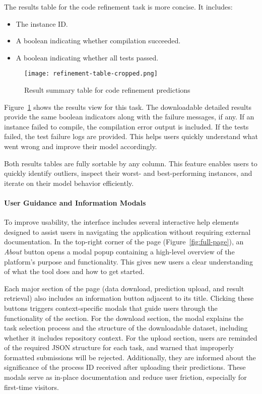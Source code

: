 The results table for the code refinement task is more concise. It includes:
\begin{itemize}
	\item The instance ID.
	\item A boolean indicating whether compilation succeeded.
	\item A boolean indicating whether all tests passed.
\end{itemize}

\begin{figure}[H]
	\centering
	\texttt{[image: refinement-table-cropped.png]}
	\caption{Result summary table for code refinement predictions}
	\label{fig:refinement-table}
\end{figure}

Figure~\ref{fig:refinement-table} shows the results view for this task. The downloadable detailed
results provide the same boolean indicators along with the failure messages, if any. If an instance
failed to compile, the compilation error output is included. If the tests failed, the test failure
logs are provided. This helps users quickly understand what went wrong and improve their model
accordingly.

Both results tables are fully sortable by any column. This feature enables users to quickly identify
outliers, inspect their worst- and best-performing instances, and iterate on their model behavior
efficiently.

\paragraph{User Guidance and Information Modals}

To improve usability, the interface includes several interactive help elements designed to assist
users in navigating the application without requiring external documentation. In the top-right
corner of the page (Figure~\ref{fig:full-page}), an \textit{About} button opens a modal popup
containing a high-level overview of the platform's purpose and functionality. This gives new users a
clear understanding of what the tool does and how to get started.

Each major section of the page (data download, prediction upload, and result retrieval) also
includes an information button adjacent to its title. Clicking these buttons triggers
context-specific modals that guide users through the functionality of the section. For the download
section, the modal explains the task selection process and the structure of the downloadable
dataset, including whether it includes repository context. For the upload section, users are
reminded of the required JSON structure for each task, and warned that improperly formatted
submissions will be rejected. Additionally, they are informed about the significance of the process
ID received after uploading their predictions. These modals serve as in-place documentation and
reduce user friction, especially for first-time visitors.


